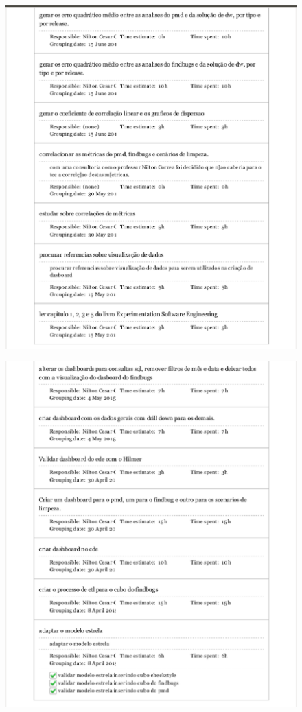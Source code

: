 \begin{apendicesenv}
\begin{figure}[h!]
\centering
\includegraphics[keepaspectratio=false,scale=0.60]{figuras/figuras_nilton/kanban3.eps}
\end{figure}

\begin{figure}[h!]
\centering
\includegraphics[keepaspectratio=false,scale=0.60]{figuras/figuras_nilton/kanban4.eps}
\end{figure}


\end{apendicesenv}

